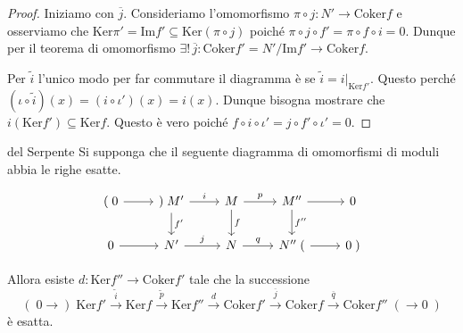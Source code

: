 \begin{proof}{}
    Iniziamo con \(\overline{j}\). Consideriamo l'omomorfismo \(\pi \circ j : N'
    \to \mathrm{Coker}f\) e osserviamo che \(\mathrm{Ker} \pi' = \mathrm{Im}f'
    \subseteq \mathrm{Ker}{(\pi \circ j)} \) poiché \(\pi \circ j \circ f' = \pi
    \circ f \circ i = 0\). Dunque per il teorema di omomorfismo \(\exists !\,
    \overline{j} : \mathrm{Coker}f' = N'/\mathrm{Im}f' \to \mathrm{Coker}f \).

    Per \(\tilde{i}\) l'unico modo per far commutare il diagramma è se
    \(\tilde{i} = i|_{\mathrm{Ker}f'} \). Questo perché \({(\iota \circ
    \tilde{i})}{(x)} = (i \circ \iota'){(x)} = i{(x)}\). Dunque bisogna mostrare
    che \(i{(\mathrm{Ker}f')} \subseteq \mathrm{Ker}f \). Questo è vero poiché
    \(f \circ i \circ \iota' = j \circ f' \circ \iota' = 0\).
\end{proof}

\begin{lemmao}{del Serpente}
    Si supponga che il seguente diagramma di omomorfismi di moduli abbia le
    righe esatte.

    \[
    \begin{tikzcd}
        {(\;0} & {)\;M'} & M & {M''} & 0 \\
        0 & {N'} & N & {N''\;(} & {0\;)}
        \arrow[from=1-1, to=1-2]
        \arrow["i", from=1-2, to=1-3]
        \arrow["{f'}", from=1-2, to=2-2]
        \arrow["p", from=1-3, to=1-4]
        \arrow["f", from=1-3, to=2-3]
        \arrow[from=1-4, to=1-5]
        \arrow["{f''}", from=1-4, to=2-4]
        \arrow[from=2-1, to=2-2]
        \arrow["j", from=2-2, to=2-3]
        \arrow["q", from=2-3, to=2-4]
        \arrow[from=2-4, to=2-5]
    \end{tikzcd}
    \]

    Allora esiste \(d : \mathrm{Ker}f'' \to \mathrm{Coker}f'\) tale che la
    successione
    \[
        (\;0\to )\;\mathrm{Ker}f' \overset{\tilde{i}}{\to}  \mathrm{Ker}f
        \overset{\tilde{p}}{\to}  \mathrm{Ker}f'' \overset{d}{\to} 
        \mathrm{Coker}f' \overset{\overline{j}}{\to}  \mathrm{Coker}f
        \overset{\overline{q}}{\to}  \mathrm{Coker}f'' \;(\to 0\;)
    \]
    è esatta.
\end{lemmao}

